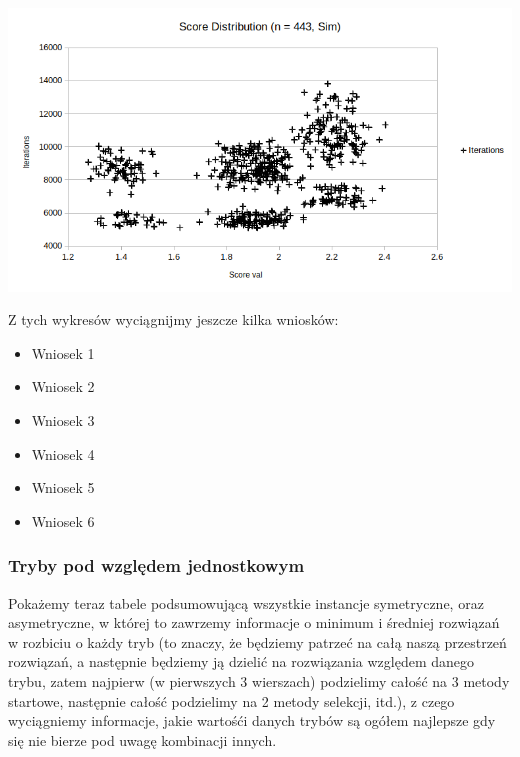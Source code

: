 \documentclass{article}
\begin{document}
\includegraphics[scale=0.36]{asimDist443}

Z tych wykresów wyciągnijmy jeszcze kilka wniosków:
\begin{itemize}
	\item Wniosek 1
	\item Wniosek 2
	\item Wniosek 3
	\item Wniosek 4
	\item Wniosek 5
	\item Wniosek 6
\end{itemize}

\subsubsection{Tryby pod względem jednostkowym}
Pokażemy teraz tabele podsumowującą wszystkie instancje symetryczne, oraz asymetryczne, w której to zawrzemy informacje o minimum i średniej rozwiązań w rozbiciu o każdy tryb (to znaczy, że będziemy patrzeć na całą naszą przestrzeń rozwiązań, a następnie będziemy ją dzielić na rozwiązania względem danego trybu, zatem najpierw (w pierwszych 3 wierszach) podzielimy całość na 3 metody startowe, następnie całość podzielimy na 2 metody selekcji, itd.), z czego wyciągniemy informacje, jakie wartośći danych trybów są ogółem najlepsze gdy się nie bierze pod uwagę kombinacji innych.
\end{document}
